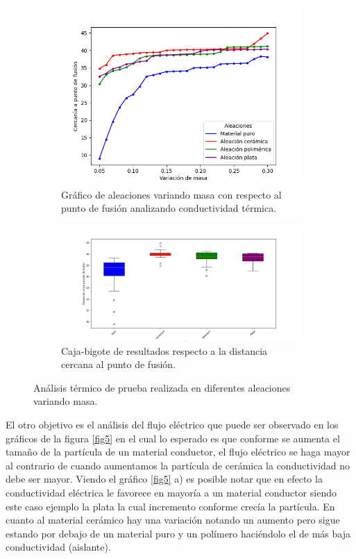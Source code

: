 \documentclass[3pt,twocolumn]{elsarticle}
\begin{document}
\begin{figure}[H]
\centering
\begin{subfigure}[b]{1\linewidth}
\includegraphics[width=\columnwidth]{temp_masa.png}
\caption{Gráfico de aleaciones variando masa con respecto al punto de fusión analizando conductividad térmica.}
\end{subfigure}
\begin{subfigure}[b]{1\linewidth}
\includegraphics[width=\columnwidth]{CB_temp_masa.png}
\caption{Caja-bigote de resultados respecto a la distancia cercana al punto de fusión.}
\end{subfigure}
\caption{Análisis térmico de prueba realizada en diferentes aleaciones variando masa.}
\label{fig4}
\end{figure}

El otro objetivo es el análisis del flujo eléctrico que puede ser observado en los gráficos de la figura \ref{fig5} en el cual lo esperado es que conforme se aumenta el tamaño de la partícula de un material conductor, el flujo eléctrico se haga mayor al contrario de cuando aumentamos la partícula de cerámica  la conductividad no debe ser mayor.
Viendo el gráfico \ref{fig5} a) es posible notar que en efecto la conductividad eléctrica le favorece en mayoría a un material conductor siendo este caso ejemplo la plata la cual incremento conforme crecía la partícula.
En cuanto al material cerámico hay una variación notando un aumento pero sigue estando por debajo de un material puro y un polímero haciéndolo el de más baja conductividad (aislante). 
\end{document}
